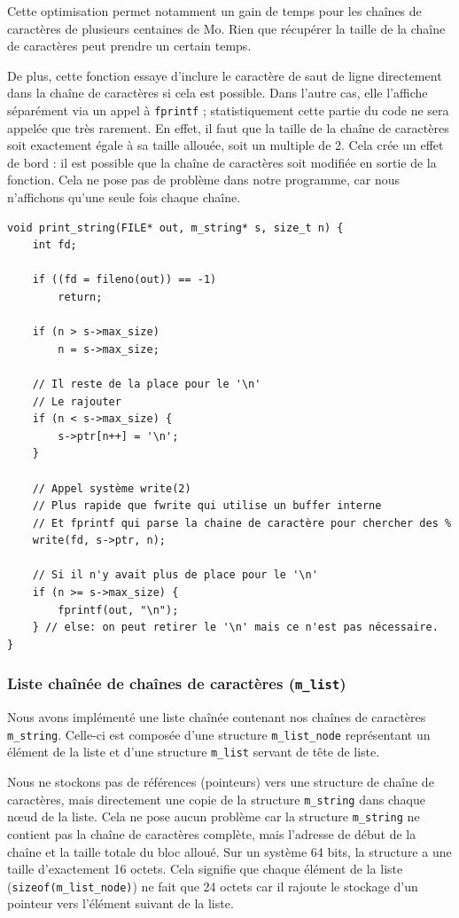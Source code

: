 \documentclass[a4paper,11pt]{article}
\begin{document}
Cette optimisation permet notamment un gain de temps pour les chaînes de caractères de plusieurs centaines de Mo. Rien que récupérer la taille de la chaîne de caractères peut prendre un certain temps.

De plus, cette fonction essaye d'inclure le caractère de saut de ligne directement dans la chaîne de caractères si cela est possible. Dans l'autre cas, elle l'affiche séparément via un appel à \texttt{fprintf} ; statistiquement cette partie du code ne sera appelée que très rarement. En effet, il faut que la taille de la chaîne de caractères soit exactement égale à sa taille allouée, soit un multiple de 2. Cela crée un effet de bord : il est possible que la chaîne de caractères soit modifiée en sortie de la fonction. Cela ne pose pas de problème dans notre programme, car nous n'affichons qu'une seule fois chaque chaîne.

\begin{verbatim}
void print_string(FILE* out, m_string* s, size_t n) {
    int fd;

    if ((fd = fileno(out)) == -1)
        return;

    if (n > s->max_size)
        n = s->max_size;

    // Il reste de la place pour le '\n'
    // Le rajouter
    if (n < s->max_size) {
        s->ptr[n++] = '\n';
    }

    // Appel système write(2)
    // Plus rapide que fwrite qui utilise un buffer interne
    // Et fprintf qui parse la chaine de caractère pour chercher des %
    write(fd, s->ptr, n);

    // Si il n'y avait plus de place pour le '\n'
    if (n >= s->max_size) {
        fprintf(out, "\n");
    } // else: on peut retirer le '\n' mais ce n'est pas nécessaire.
}
\end{verbatim}

\subsubsection{Liste chaînée de chaînes de caractères (\texttt{m\_list})}
\label{m_list}

Nous avons implémenté une liste chaînée contenant nos chaînes de caractères \texttt{m\_string}. Celle-ci est composée d'une structure \texttt{m\_list\_node} représentant un élément de la liste et d'une structure \texttt{m\_list} servant de tête de liste.

Nous ne stockons pas de références (pointeurs) vers une structure de chaîne de caractères, mais directement une copie de la structure \texttt{m\_string} dans chaque nœud de la liste. Cela ne pose aucun problème car la structure \texttt{m\_string} ne contient pas la chaîne de caractères complète, mais l'adresse de début de la chaîne et la taille totale du bloc alloué. Sur un système 64 bits, la structure a une taille d'exactement 16 octets. Cela signifie que chaque élément de la liste (\texttt{sizeof(m\_list\_node)}) ne fait que 24 octets car il rajoute le stockage d'un pointeur vers l'élément suivant de la liste.
\end{document}

